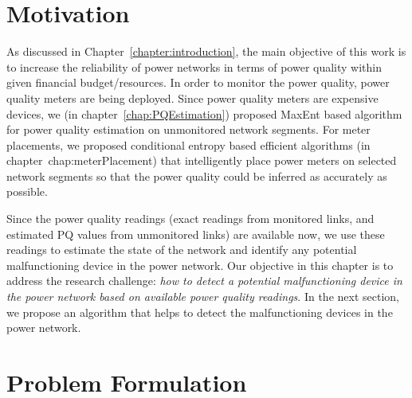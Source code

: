 \documentclass[12pt,oneside]{book}
\begin{document}
\label{chap:predictionModel}
\section{Motivation}
As discussed in Chapter~\ref{chapter:introduction}, the main objective of this work is to increase the reliability of power networks in terms of power quality within given financial budget/resources. In order to monitor the power quality, power quality meters are being deployed. Since power quality meters are expensive devices, we (in chapter~\ref{chap:PQEstimation}) proposed MaxEnt based algorithm for power quality estimation on unmonitored network segments. For meter placements, we proposed conditional entropy based efficient algorithms (in chapter~{chap:meterPlacement}) that intelligently place power meters on selected network segments so that the power quality could be inferred as accurately as possible.

Since the power quality readings (exact readings from monitored links, and estimated PQ values from unmonitored links) are available now, we use these readings to estimate the state of the network and identify any potential malfunctioning device in the power network. Our objective in this chapter is to address the research challenge: \textit{how to detect a potential malfunctioning device in the power network based on available power quality readings}. In the next section, we propose an algorithm that helps to detect the malfunctioning devices in the power network.

\section{Problem Formulation}
\end{document}
